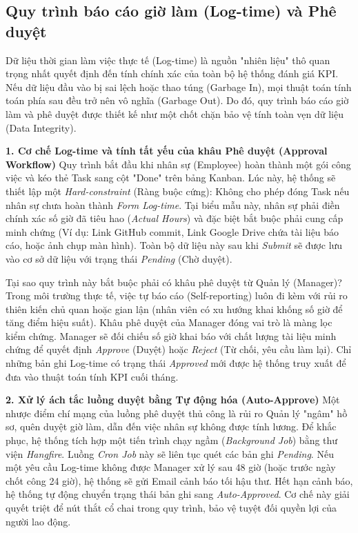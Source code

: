 \documentclass[a4paper,13.5pt]{extreport}
\begin{document}
\subsection{Quy trình báo cáo giờ làm (Log-time) và Phê duyệt}

Dữ liệu thời gian làm việc thực tế (Log-time) là nguồn "nhiên liệu" thô quan trọng nhất quyết định đến tính chính xác của toàn bộ hệ thống đánh giá KPI. Nếu dữ liệu đầu vào bị sai lệch hoặc thao túng (Garbage In), mọi thuật toán tính toán phía sau đều trở nên vô nghĩa (Garbage Out). Do đó, quy trình báo cáo giờ làm và phê duyệt được thiết kế như một chốt chặn bảo vệ tính toàn vẹn dữ liệu (Data Integrity).

\textbf{1. Cơ chế Log-time và tính tất yếu của khâu Phê duyệt (Approval Workflow)}
Quy trình bắt đầu khi nhân sự (Employee) hoàn thành một gói công việc và kéo thẻ Task sang cột "Done" trên bảng Kanban. Lúc này, hệ thống sẽ thiết lập một \textit{Hard-constraint} (Ràng buộc cứng): Không cho phép đóng Task nếu nhân sự chưa hoàn thành \textit{Form Log-time}.
Tại biểu mẫu này, nhân sự phải điền chính xác số giờ đã tiêu hao (\textit{Actual Hours}) và đặc biệt bắt buộc phải cung cấp minh chứng (Ví dụ: Link GitHub commit, Link Google Drive chứa tài liệu báo cáo, hoặc ảnh chụp màn hình). Toàn bộ dữ liệu này sau khi \textit{Submit} sẽ được lưu vào cơ sở dữ liệu với trạng thái \textit{Pending} (Chờ duyệt).

Tại sao quy trình này bắt buộc phải có khâu phê duyệt từ Quản lý (Manager)? 
Trong môi trường thực tế, việc tự báo cáo (Self-reporting) luôn đi kèm với rủi ro thiên kiến chủ quan hoặc gian lận (nhân viên có xu hướng khai khống số giờ để tăng điểm hiệu suất). Khâu phê duyệt của Manager đóng vai trò là màng lọc kiểm chứng. Manager sẽ đối chiếu số giờ khai báo với chất lượng tài liệu minh chứng để quyết định \textit{Approve} (Duyệt) hoặc \textit{Reject} (Từ chối, yêu cầu làm lại). Chỉ những bản ghi Log-time có trạng thái \textit{Approved} mới được hệ thống truy xuất để đưa vào thuật toán tính KPI cuối tháng.

\textbf{2. Xử lý ách tắc luồng duyệt bằng Tự động hóa (Auto-Approve)}
Một nhược điểm chí mạng của luồng phê duyệt thủ công là rủi ro Quản lý "ngâm" hồ sơ, quên duyệt giờ làm, dẫn đến việc nhân sự không được tính lương. Để khắc phục, hệ thống tích hợp một tiến trình chạy ngầm (\textit{Background Job}) bằng thư viện \textit{Hangfire}. Luồng \textit{Cron Job} này sẽ liên tục quét các bản ghi \textit{Pending}. Nếu một yêu cầu Log-time không được Manager xử lý sau 48 giờ (hoặc trước ngày chốt công 24 giờ), hệ thống sẽ gửi Email cảnh báo tối hậu thư. Hết hạn cảnh báo, hệ thống tự động chuyển trạng thái bản ghi sang \textit{Auto-Approved}. Cơ chế này giải quyết triệt để nút thắt cổ chai trong quy trình, bảo vệ tuyệt đối quyền lợi của người lao động.
\end{document}
